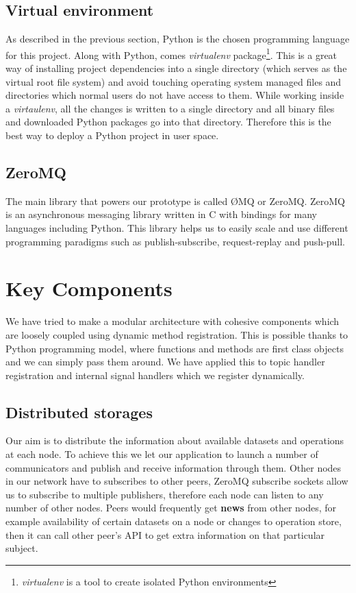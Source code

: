 \subsection{Virtual environment}
As described in the previous section, Python is the chosen programming language for this project. Along with Python, 
comes \textit{virtualenv} package\footnote{\textit{virtualenv} is a tool to create isolated Python environments}. This is a great way of installing
project dependencies into a single directory (which serves as the virtual root file system) and avoid touching operating system managed files and
directories which normal users do not have access to them. While working inside a \textit{virtaulenv}, all the changes is written to a single directory
and all binary files and downloaded Python packages go into that directory.
 Therefore this is the best way to deploy a Python project in user space.

\subsection{ZeroMQ}
The main library that powers our prototype is called ØMQ or ZeroMQ.
ZeroMQ is an asynchronous messaging library written in C with 
bindings for many languages including Python. This library helps us to easily scale and use 
different programming paradigms such as publish-subscribe, request-replay and push-pull.

\section{Key Components}
We have tried to make a modular architecture with cohesive components which are loosely coupled using dynamic
method registration. This is possible thanks to Python programming model, where functions and methods are first
class objects and we can simply pass them around. We have applied this to topic handler registration and
internal signal handlers which we register dynamically.

\subsection{Distributed storages}
Our aim is to distribute the information about available datasets and operations at each node. To achieve this
we let our application to launch a number of communicators and publish and receive information through them.
Other nodes in our network have to subscribes to other peers, ZeroMQ subscribe sockets allow us to subscribe
to multiple publishers, therefore each node can listen to any number of other nodes. Peers would frequently get
\textbf{news} from other nodes, for example availability of certain datasets on a node or changes to operation
store, then it
can call other peer's API to get extra information on that particular subject.

